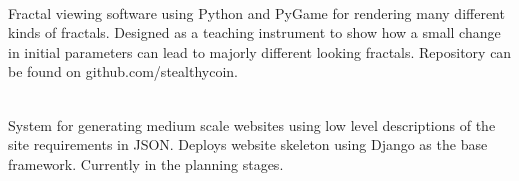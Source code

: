 \documentclass[11pt]{article} %
\begin{document}
\bigskip
{}
\begin{adjustwidth}{.3in}{0cm}
  \\
  Fractal viewing software using Python and PyGame for rendering many different kinds of fractals. 
  Designed as a teaching instrument to show how a small change in initial parameters can lead to majorly different looking fractals. Repository can be found on github.com/stealthycoin.

  \bigskip
  \\
  System for generating medium scale websites using low level descriptions of the site requirements in JSON. Deploys website skeleton using Django as the base framework. Currently in the planning stages.
\end{adjustwidth}
\end{document}
